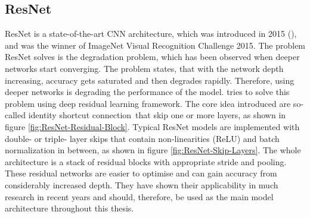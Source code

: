 \subsection{ResNet}
\label{sub:ResNet}
\Gls{ResNet} is a state-of-the-art \gls{CNN} architecture, which was introduced in 2015 (\cite{he_deep_2015}), and was the winner of ImageNet Visual Recognition Challenge 2015. The problem \gls{ResNet} solves is the degradation problem, which has been observed when deeper networks start converging. The problem states, that with the network depth increasing, accuracy gets saturated and then degrades rapidly. Therefore, using deeper networks is degrading the performance of the model. \cite{he_deep_2015} tries to solve this problem using deep residual learning framework. The core idea introduced are so-called \flqq identity shortcut connection\frqq \ that skip one or more layers, as shown in figure \ref{fig:ResNet-Residual-Block}. Typical \gls{ResNet} models are implemented with double- or triple- layer skips that contain non-linearities (ReLU) and batch normalization in between, as shown in figure \ref{fig:ResNet-Skip-Layers}. The whole architecture is a stack of residual blocks with appropriate stride and pooling. These residual networks are easier to optimise and can gain accuracy from considerably increased depth. They have shown their applicability in much research in recent years and should, therefore, be used as the main model architecture throughout this thesis.
